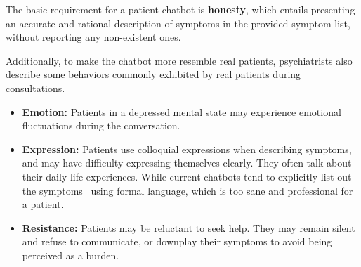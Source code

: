 
The basic requirement for a patient chatbot is \textbf{honesty}, which entails presenting an accurate and rational description of symptoms in the provided symptom list, without reporting any non-existent ones.

Additionally, to make the chatbot more resemble real patients, psychiatrists also describe some behaviors commonly exhibited by real patients during consultations. 
\begin{itemize}
    \item \textbf{Emotion:} Patients in a depressed mental state may experience emotional fluctuations during the conversation.
    \item \textbf{Expression:} Patients use colloquial expressions when describing symptoms, and may have difficulty expressing themselves clearly. They often talk about their daily life experiences. While current chatbots tend to explicitly list out the symptoms~\cite{Llanos2021Lessons} using formal language, which is too sane and professional for a patient.
    \item \textbf{Resistance:} Patients may be reluctant to seek help. They may remain silent and refuse to communicate, or downplay their symptoms to avoid being perceived as a burden. 
\end{itemize}



